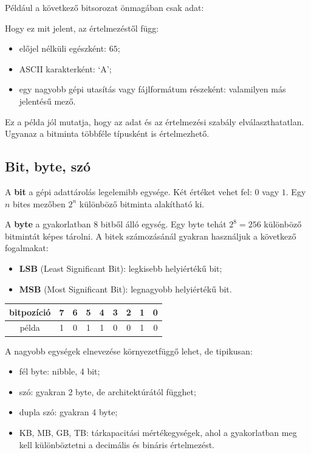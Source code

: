 Például a következő bitsorozat önmagában csak adat:


Hogy ez mit jelent, az értelmezéstől függ:

\begin{itemize}
  \item előjel nélküli egészként: $65$;
  \item ASCII karakterként: `A';
  \item egy nagyobb gépi utasítás vagy fájlformátum részeként: valamilyen más jelentésű mező.
\end{itemize}

Ez a példa jól mutatja, hogy az adat és az értelmezési szabály elválaszthatatlan. Ugyanaz a bitminta többféle típusként is értelmezhető.

\subsection{Bit, byte, szó}

A \textbf{bit} a gépi adattárolás legelemibb egysége. Két értéket vehet fel: $0$ vagy $1$. Egy $n$ bites mezőben $2^n$ különböző bitminta alakítható ki.

A \textbf{byte} a gyakorlatban 8 bitből álló egység. Egy byte tehát $2^8=256$ különböző bitmintát képes tárolni. A bitek számozásánál gyakran használjuk a következő fogalmakat:

\begin{itemize}
  \item \textbf{LSB} (Least Significant Bit): legkisebb helyiértékű bit;
  \item \textbf{MSB} (Most Significant Bit): legnagyobb helyiértékű bit.
\end{itemize}

\begin{center}
\begin{tabular}{c|cccccccc}
bitpozíció & 7 & 6 & 5 & 4 & 3 & 2 & 1 & 0 \\
\midrule
példa & 1 & 0 & 1 & 1 & 0 & 0 & 1 & 0
\end{tabular}
\end{center}

A nagyobb egységek elnevezése környezetfüggő lehet, de tipikusan:

\begin{itemize}
  \item fél byte: nibble, 4 bit;
  \item szó: gyakran 2 byte, de architektúrától függhet;
  \item dupla szó: gyakran 4 byte;
  \item KB, MB, GB, TB: tárkapacitási mértékegységek, ahol a gyakorlatban meg kell különböztetni a decimális és bináris értelmezést.
\end{itemize}

